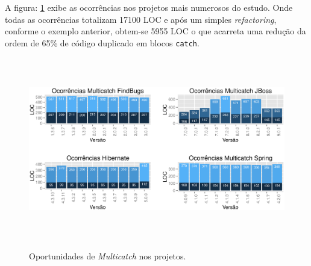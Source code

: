 A figura: \ref{fig:ocorrenciasMulticatchVersoes} exibe as ocorrências nos projetos mais numerosos do estudo. Onde todas as ocorrências totalizam 17100 \acs{LOC} e após um simples \textit{refactoring}, 
conforme o exemplo anterior, obtem-se 5955 \acs{LOC} o que acarreta uma redução da ordem de 65\% de c\'{o}digo duplicado em blocos \texttt{catch}.

\begin{figure}[h]
	\center
	\includegraphics[height=8cm, keepaspectratio]{Imagens/ocorrenciasMulticatchVersoes}
	\label{fig:ocorrenciasMulticatchVersoes}
	\caption{Oportunidades de \textit{Multicatch} nos projetos.}
\end{figure}

